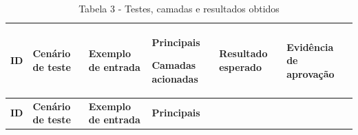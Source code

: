 \documentclass[
]{article}
\begin{document}
\begin{longtable}[]{@{}
  >{\raggedright\arraybackslash}p{}
  >{\raggedright\arraybackslash}p{}
  >{\raggedright\arraybackslash}p{}
  >{\raggedright\arraybackslash}p{}
  >{\raggedright\arraybackslash}p{}
  >{\raggedright\arraybackslash}p{}@{}}
\caption{Tabela 3 - Testes, camadas e resultados obtidos}\tabularnewline
\toprule\noalign{}
\begin{minipage}[b]{\linewidth}\raggedright
\textbf{ID}
\end{minipage} & \begin{minipage}[b]{\linewidth}\raggedright
\textbf{Cenário de teste}
\end{minipage} & \begin{minipage}[b]{\linewidth}\raggedright
\textbf{Exemplo de entrada}
\end{minipage} & \begin{minipage}[b]{\linewidth}\raggedright
\textbf{Principais}

\textbf{Camadas acionadas}
\end{minipage} & \begin{minipage}[b]{\linewidth}\raggedright
\textbf{Resultado esperado}
\end{minipage} & \begin{minipage}[b]{\linewidth}\raggedright
\textbf{Evidência de aprovação}
\end{minipage} \\
\midrule\noalign{}
\endfirsthead
\toprule\noalign{}
\begin{minipage}[b]{\linewidth}\raggedright
\textbf{ID}
\end{minipage} & \begin{minipage}[b]{\linewidth}\raggedright
\textbf{Cenário de teste}
\end{minipage} & \begin{minipage}[b]{\linewidth}\raggedright
\textbf{Exemplo de entrada}
\end{minipage} & \begin{minipage}[b]{\linewidth}\raggedright
\textbf{Principais}


\end{minipage}
\end{longtable}
\end{document}
